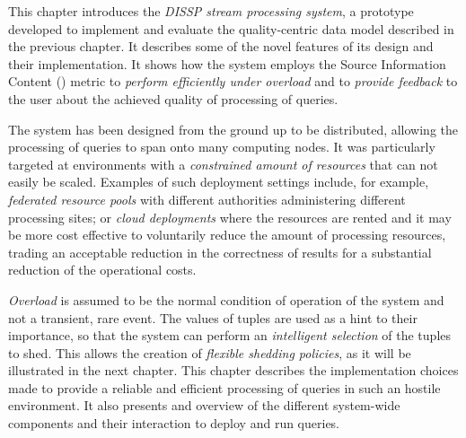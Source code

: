 This chapter introduces the \emph{DISSP stream processing system}, a prototype developed to implement and
evaluate the quality-centric data model described in the previous chapter. 
It describes some of the novel features of its design and their implementation.
It shows how the system employs the Source Information Content (\sic) metric to \emph{perform efficiently
under overload} and to \emph{provide feedback} to the user about the achieved quality of processing of queries.

The system has been designed from the ground up to be distributed, allowing the processing of queries to
span onto many computing nodes.
It was particularly targeted at environments with a \emph{constrained amount of resources} that can not
easily be scaled. Examples of such deployment settings include, for example, \emph{federated resource
pools} with different authorities administering different processing sites; or \emph{cloud deployments}
where the resources are rented and it may be more cost effective to voluntarily reduce the amount of
processing resources, trading an acceptable reduction in the correctness of results for a substantial 
reduction of the operational costs. 

\emph{Overload} is assumed to be the normal condition of operation of the system and not a transient,
rare event. 
The \sic values of tuples are used as a hint to their importance, so that the system can perform an 
\emph{intelligent selection} of the tuples to shed. This allows the creation of \emph{flexible shedding
policies}, as it will be illustrated in the next chapter.
This chapter describes the implementation choices made to provide a reliable and efficient
processing of queries in such an hostile environment.
It also presents and overview of the different system-wide components and their interaction to deploy and
run queries. 

\pagebreak

